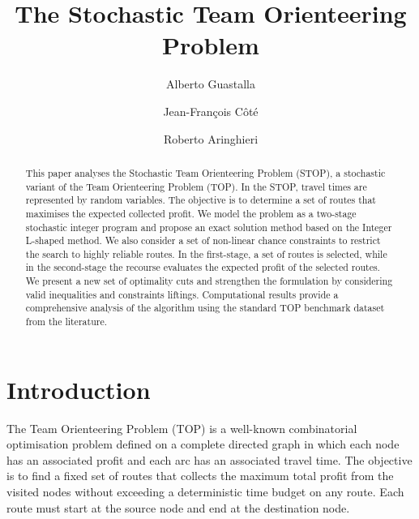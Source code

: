 \documentclass[11pt]{article}
\title{\Large\bf The Stochastic Team Orienteering Problem}
\author[1]{Alberto Guastalla}
\author[2]{Jean-François Côté}
\author[1]{Roberto Aringhieri}
\affil[1]{\footnotesize Department of Computer Science, University of Turin, Italy}%
\affil[2]{\footnotesize CIRRELT, Université Laval, Québec, Canada}%
\theoremstyle{definition}
\begin{document}
\maketitle

\begin{abstract}
This paper analyses the Stochastic Team Orienteering Problem (STOP), a stochastic variant of the Team Orienteering Problem (TOP). In the STOP, travel times are represented by random variables. The objective is to determine a set of routes that maximises the expected collected profit.
We model the problem as a two-stage stochastic integer program and propose an exact solution method based on the Integer L-shaped method. We also consider a set of non-linear chance constraints to restrict the search to highly reliable routes.
In the first-stage, a set of routes is selected, while in the second-stage the recourse evaluates the expected profit of the selected routes. We present a new set of optimality cuts and strengthen the formulation by considering valid inequalities and constraints liftings. Computational results provide a comprehensive analysis of the algorithm using the standard TOP benchmark dataset from the literature.
\end{abstract}





\section{Introduction}
\label{sec:introduction}

The Team Orienteering Problem (TOP) is a well-known combinatorial optimisation problem defined on a complete directed graph in which each node has an associated profit and each arc has an associated travel time. The objective is to find a fixed set of routes that collects the maximum total profit from the visited nodes without exceeding a deterministic time budget on any route. Each route must start at the source node and end at the destination node.
\end{document}
